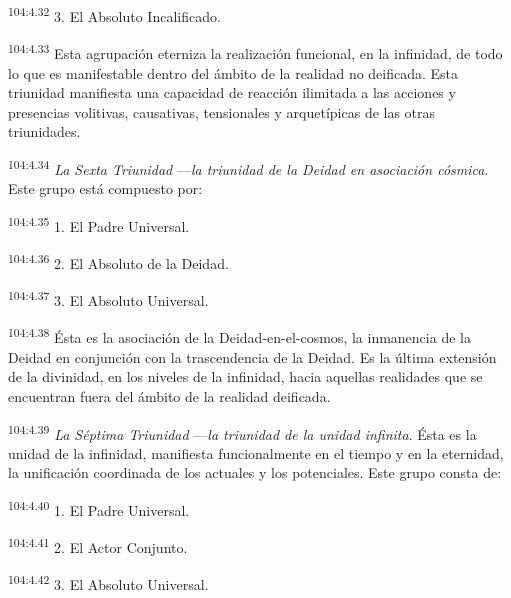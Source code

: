 \par
\textsuperscript{104:4.32} 3. El Absoluto Incalificado.

\par
\textsuperscript{104:4.33} Esta agrupación eterniza la realización funcional, en la infinidad, de todo lo que es manifestable dentro del ámbito de la realidad no deificada. Esta triunidad manifiesta una capacidad de reacción ilimitada a las acciones y presencias volitivas, causativas, tensionales y arquetípicas de las otras triunidades.

\par
\textsuperscript{104:4.34} \textit{La Sexta Triunidad} ---\textit{la triunidad de la Deidad en asociación cósmica}. Este grupo está compuesto por:

\par
\textsuperscript{104:4.35} 1. El Padre Universal.

\par
\textsuperscript{104:4.36} 2. El Absoluto de la Deidad.

\par
\textsuperscript{104:4.37} 3. El Absoluto Universal.

\par
\textsuperscript{104:4.38} Ésta es la asociación de la Deidad-en-el-cosmos, la inmanencia de la Deidad en conjunción con la trascendencia de la Deidad. Es la última extensión de la divinidad, en los niveles de la infinidad, hacia aquellas realidades que se encuentran fuera del ámbito de la realidad deificada.

\par
\textsuperscript{104:4.39} \textit{La Séptima Triunidad} ---\textit{la triunidad de la unidad infinita}. Ésta es la unidad de la infinidad, manifiesta funcionalmente en el tiempo y en la eternidad, la unificación coordinada de los actuales y los potenciales. Este grupo consta de:

\par
\textsuperscript{104:4.40} 1. El Padre Universal.

\par
\textsuperscript{104:4.41} 2. El Actor Conjunto.

\par
\textsuperscript{104:4.42} 3. El Absoluto Universal.

